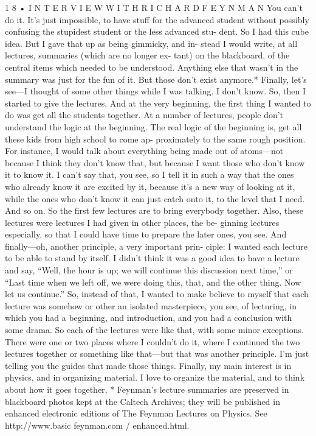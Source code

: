 \documentclass[11pt,oneside]{article}
\begin{document}
1 8 • I N T E R V I E W  W I T H  R I C H A R D  F E Y N M A N You can’t do it. It’s just impossible, to have stuff for the advanced student without possibly confusing the stupidest student or the less advanced stu- dent. So I had this cube idea. But I gave that up as being gimmicky, and in- stead I would write, at all lectures, summaries (which are no longer ex- tant) on the blackboard, of the central items which needed to be understood. Anything else that wasn’t in the summary was just for the fun of it. But those don’t exist anymore.* Finally, let’s see---I thought of some other things while I was talking. I don’t know. So, then I started to give the lectures. And at the very beginning, the first thing I wanted to do was get all the students together. At a number of lectures, people don’t understand the logic at the beginning. The real logic of the beginning is, get all these kids from high school to come ap- proximately to the same rough position. For instance, I would talk about everything being made out of atoms---not because I think they don’t know that, but because I want those who don’t know it to know it. I can’t say that, you see, so I tell it in such a way that the ones who already know it are excited by it, because it’s a new way of looking at it, while the ones who don’t know it can just catch onto it, to the level that I need. And so on. So the first few lectures are to bring everybody together. Also, these lectures were lectures I had given in other places, the be- ginning lectures especially, so that I could have time to prepare the later ones, you see. And finally---oh, another principle, a very important prin- ciple: I wanted each lecture to be able to stand by itself. I didn’t think it was a good idea to have a lecture and say, “Well, the hour is up; we will continue this discussion next time,” or “Last time when we left off, we were doing this, that, and the other thing. Now let us continue.” So, instead of that, I wanted to make believe to myself that each lecture was somehow or other an isolated masterpiece, you see, of lecturing, in which you had a beginning, and introduction, and you had a conclusion with some drama. So each of the lectures were like that, with some minor exceptions. There were one or two places where I couldn’t do it, where I continued the two lectures together or something like that---but that was another principle. I’m just telling you the guides that made those things. Finally, my main interest is in physics, and in organizing material. I love to organize the material, and to think about how it goes together, * Feynman’s lecture summaries are preserved in blackboard photos kept at the Caltech Archives; they will be published in enhanced electronic editions of The Feynman Lectures on Physics. See http://www.basic feynman.com / enhanced.html.\par
\end{document}
